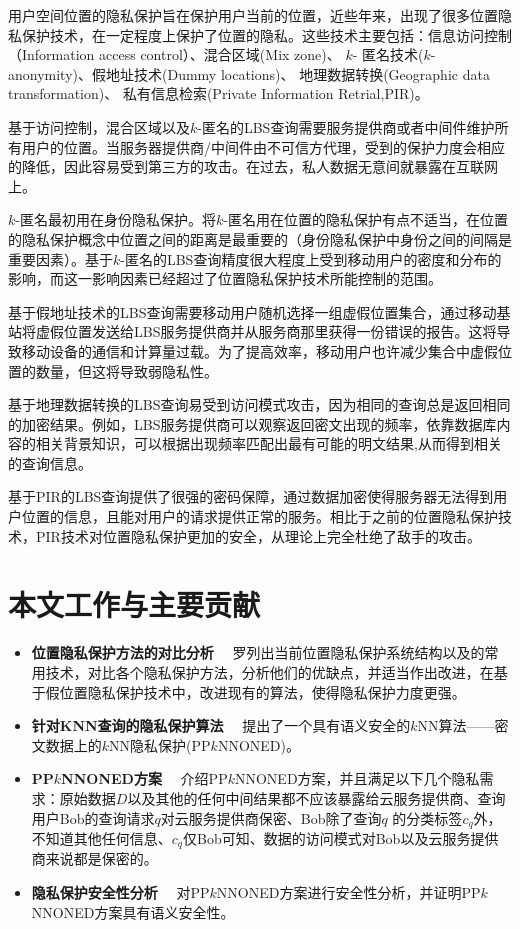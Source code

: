 用户空间位置的隐私保护旨在保护用户当前的位置，近些年来，出现了很多位置隐私保护技术，在一定程度上保护了位置的隐私。这些技术主要包括：信息访问控制（Information access control）\cite{Myles}\cite{Youssef}、混合区域(Mix zone)\cite{Beresford}、 {$k$}- 匿名技术({$k$}-anonymity)\cite{Bamba}\cite{Chow}\cite{Mokbel}、假地址技术(Dummy locations)\cite{YiuML}\cite{Shankar}、 地理数据转换(Geographic data transformation)\cite{HuH}\cite{Khoshgozaran}、 私有信息检索(Private Information Retrial,PIR)\cite{Ghinita}\cite{GhinitaPRIVE}。

基于访问控制，混合区域以及{$k$}-匿名的LBS查询需要服务提供商或者中间件维护所有用户的位置。当服务器提供商/中间件由不可信方代理，受到的保护力度会相应的降低，因此容易受到第三方的攻击。在过去，私人数据无意间就暴露在互联网上。

{$k$}-匿名最初用在身份隐私保护。将{$k$}-匿名用在位置的隐私保护有点不适当，在位置的隐私保护概念中位置之间的距离是最重要的（身份隐私保护中身份之间的间隔是重要因素）。基于{$k$}-匿名的LBS查询精度很大程度上受到移动用户的密度和分布的影响，而这一影响因素已经超过了位置隐私保护技术所能控制的范围。

基于假地址技术的LBS查询需要移动用户随机选择一组虚假位置集合，通过移动基站将虚假位置发送给LBS服务提供商并从服务商那里获得一份错误的报告。这将导致移动设备的通信和计算量过载。为了提高效率，移动用户也许减少集合中虚假位置的数量，但这将导致弱隐私性。

基于地理数据转换的LBS查询易受到访问模式攻击\cite{Williams}，因为相同的查询总是返回相同的加密结果。例如，LBS服务提供商可以观察返回密文出现的频率，依靠数据库内容的相关背景知识，可以根据出现频率匹配出最有可能的明文结果,从而得到相关的查询信息。

基于PIR的LBS查询提供了很强的密码保障，通过数据加密使得服务器无法得到用户位置的信息，且能对用户的请求提供正常的服务。相比于之前的位置隐私保护技术，PIR技术对位置隐私保护更加的安全，从理论上完全杜绝了敌手的攻击。


\section{本文工作与主要贡献}
\begin{itemize}
  \item \textbf{位置隐私保护方法的对比分析} ~~罗列出当前位置隐私保护系统结构以及的常用技术，对比各个隐私保护方法，分析他们的优缺点，并适当作出改进，在基于假位置隐私保护技术中，改进现有的算法，使得隐私保护力度更强。
  \item \textbf{针对KNN查询的隐私保护算法} ~~提出了一个具有语义安全的$k$NN算法——密文数据上的$k$NN隐私保护(PP$k$NNONED)。
  \item \textbf{PP$k$NNONED方案} ~~介绍PP$k$NNONED方案，并且满足以下几个隐私需求：原始数据$D$以及其他的任何中间结果都不应该暴露给云服务提供商、查询用户Bob的查询请求$q$对云服务提供商保密、Bob除了查询$q$ 的分类标签$c_q$外，不知道其他任何信息、$c_q$仅Bob可知、数据的访问模式对Bob以及云服务提供商来说都是保密的。
  \item \textbf{隐私保护安全性分析} ~~对PP$k$NNONED方案进行安全性分析，并证明PP$k$NNONED方案具有语义安全性。
\end{itemize}
